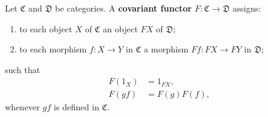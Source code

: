 Let $\mathfrak{C}$ and $\mathfrak{D}$ be categories. A \textbf{covariant functor} $F: \mathfrak{C} \to \mathfrak{D}$ assigns:

\begin{enumerate}
\item to each object $X$ of $\mathfrak{C}$ an object $FX$ of $\mathfrak{D}$;
\item to each morphism $f: X \to Y$ in $\mathfrak{C}$ a morphism $Ff: FX \to FY$ in $\mathfrak{D}$;
\end{enumerate}

such that
\begin{align}
F(1_X) &= 1_{FX}, \\
F(gf) &= F(g) F(f),
\end{align}
whenever $gf$ is defined in $\mathfrak{C}$.
